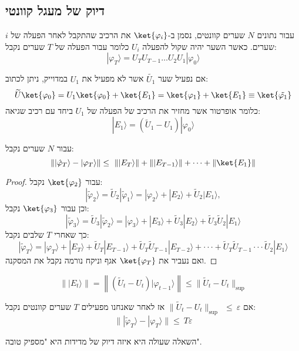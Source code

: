 \documentclass{tstextbook}
\begin{document}
\subsection{דיוק של מעגל קוונטי}

\begin{symbolize}
עבור נתונים \(N\) שערים קוונטים, נסמן ב-\(\ket{\varphi_{i}}\) את הרכיב שהתקבל לאחר הפעלה של \(i\) שערים. כאשר השער יהיה שקול להפעלה \(U_{i}\)
כלומר עבור הפעלה של \(T\) שערים נקבל:
$$|\varphi_{T}\rangle=U_{T}U_{T-1}\ldots U_{2}U_{1}|\varphi_{0}\rangle$$

\end{symbolize}
\begin{proposition}
אם נפעיל שער \(\tilde{U_{1}}\) אשר לא מפעיל את \(U_{1}\) במדוייק, ניתן לכתוב: 
$$ \widetilde{U}\ket{\varphi_{0}}=U_{1}\ket{\varphi_{0}} +\ket{E_{1}} =\ket{\varphi_{1}}+\ket{E_{1}}\equiv \ket{\tilde{\varphi_{1}}} $$
כלומר אופרטור אשר מחזיר את הרכיב של הפעלה של \(U_{1}\)  ביחד עם רכיב שגיאה:
$$|E_{1}\rangle=( \widetilde{U}_{1}-U_{1})|\varphi_{0}\rangle$$

\end{proposition}
\begin{corollary}
עבור \(N\) שערים נקבל:
$$\left\lVert  |\hat{\varphi}_{T}\rangle-|\varphi_{T}\rangle  \right\rVert \leq~\left\lVert  |E_{T}\rangle  \right\rVert +\left\lVert  |E_{T-1}\rangle  \right\rVert +\dots+\lVert \ket{E_{1}} \rVert $$

\end{corollary}
\begin{proof}
עבור \(\ket{\varphi_{2}}\) נקבל:
$$|\tilde{\varphi}_{2}\rangle= \widetilde{U}_{2}|\tilde{\varphi}_{1}\rangle=|\varphi_{2}\rangle+|E_{2}\rangle+ \widetilde{U}_{2}|E_{1}\rangle,$$
וכן עבור \(\ket{\varphi_{3}}\) נקבל:
$$|\tilde{\varphi}_{3}\rangle= \widetilde{U}_{3}|\tilde{\varphi}_{2}\rangle=|\varphi_{3}\rangle+|E_{3}\rangle+ \widetilde{U}_{3}|E_{2}\rangle+ \widetilde{U}_{3} \widetilde{U}_{2}|E_{1}\rangle$$
כך שאחרי \(T\) שלבים נקבל:
$$|\tilde{\varphi}_{T}\rangle=|\varphi_{T}\rangle+|E_{T}\rangle+ \widetilde{U}_{T}|E_{T-1}\rangle+ \widetilde{U}_{T} \widetilde{U}_{T-1}|E_{T-2}\rangle+\cdot\cdot\cdot+\widetilde{U}_{T}\widetilde{U}_{T-1}\cdot\cdot\cdot\widetilde{U}_{2}|E_{1}\rangle$$
ואם נעביר את \(\ket{\varphi_{T}}\) אגף וניקח נורמה נקבל את המסקנה.

\end{proof}
\begin{proposition}
$$\left\lVert  |E_{t}\rangle  \right\rVert = \left\lVert  \left(\widetilde{U}_{t}-U_{t}\right)|\varphi_{t-1}\rangle  \right\rVert  \leq \lVert \widetilde{U}_{t}-U_{t} \rVert _{\mathrm{sup}}$$

\end{proposition}
\begin{corollary}
אם \(\parallel\widetilde{U}_{t}-U_{t}\parallel_{\mathrm{sup}}\ \ \leq\ \varepsilon\) אז לאחר שאנחנו מפעילים \(T\) שערים קוונטים נקבל:
$$\lVert |\tilde{\varphi}_{T}\rangle-|\varphi_{T}\rangle \rVert  \leq\ T\varepsilon$$

\end{corollary}
השאלה שעולה היא איזה דיוק של מדידות היא "מספיק טובה".
\end{document}
